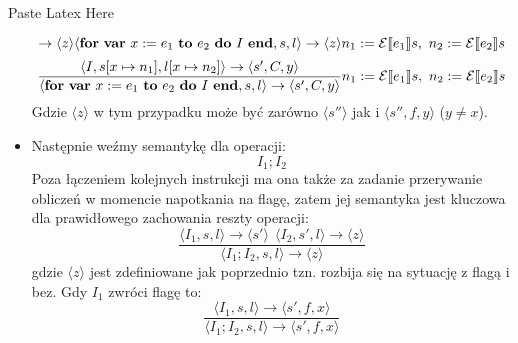 Paste Latex Here\documentclass{article}
\begin{document}
\begin{itemize}
$${	      	\rightarrow \langle z \rangle
	      	} {
	      	\langle {\bf for} \ {\bf var} \ x := e_1 \ {\bf to} \ e_2 \ {\bf do} \ I \ {\bf end}, s, l \rangle
	      	\rightarrow \langle z \rangle
	      }
	      n_1 := \mathcal{E} \llbracket e_1 \rrbracket s, \
	      n_2 := \mathcal{E} \llbracket e_2 \rrbracket s
	      $$
	      $$
	      \frac {
	      	\langle I, s[x\mapsto n_1], l[x\mapsto n_2] \rangle \rightarrow \langle s', C, y \rangle
	      	} {
	      	\langle {\bf for} \ {\bf var} \ x := e_1 \ {\bf to} \ e_2 \ {\bf do} \ I \ {\bf end}, s, l \rangle
	      	\rightarrow \langle s', C, y \rangle
	      }
	      n_1 := \mathcal{E} \llbracket e_1 \rrbracket s, \
	      n_2 := \mathcal{E} \llbracket e_2 \rrbracket s
	      $$
	      Gdzie $\langle z \rangle$ w tym przypadku może być zarówno $\langle s'' \rangle$ jak i $\langle s'', f, y\rangle$ ($y \neq x$).

	\item
	      Następnie weźmy semantykę dla operacji:
	      $$
	      I_{1}; I_{2}
	      $$
	      Poza łączeniem kolejnych instrukcji ma ona także za zadanie przerywanie obliczeń w momencie napotkania na flagę, zatem jej semantyka jest kluczowa dla prawidłowego zachowania reszty operacji:
	      $$
	      \frac {
	      	\langle I_{1}, s, l \rangle \rightarrow \langle s' \rangle \ \
	      	\langle I_{2}, s', l \rangle \rightarrow \langle z \rangle
	      	} {
	      	\langle I_{1}; I_{2}, s, l \rangle
	      	\rightarrow \langle z \rangle
	      }
	      $$
	      gdzie $\langle z \rangle$ jest zdefiniowane jak poprzednio tzn. rozbija się na sytuację z flagą i bez. Gdy $I_{1}$ zwróci flagę to:
	      $$
	      \frac {
	      	\langle I_{1}, s, l \rangle \rightarrow \langle s',f,x \rangle
	      	} {
	      	\langle I_{1}; I_{2}, s, l \rangle
	      	\rightarrow \langle s',f,x \rangle
	      }
	      $$


\end{itemize}
\end{document}
